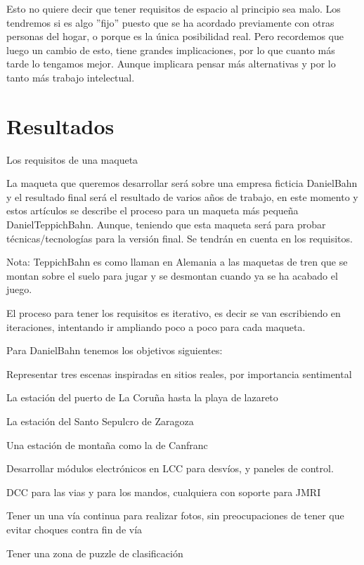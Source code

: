  

Esto no quiere decir que tener requisitos de espacio al principio sea malo. Los tendremos si es algo ”fijo” puesto que se ha acordado previamente con otras personas del hogar, o porque es la única posibilidad real. Pero recordemos que luego un cambio de esto, tiene grandes implicaciones, por lo que cuanto más tarde  lo tengamos mejor. Aunque implicara pensar más alternativas y por lo tanto más trabajo intelectual. 

 
\section{Resultados}
Los requisitos de una maqueta 

La maqueta que queremos desarrollar será sobre una empresa ficticia DanielBahn y el resultado final será el resultado de varios años de trabajo, en este momento y estos artículos se describe el proceso para un maqueta más pequeña DanielTeppichBahn. Aunque, teniendo que esta maqueta será para probar técnicas/tecnologías para la versión final. Se tendrán en cuenta en los requisitos. 

 

Nota: TeppichBahn es como llaman en Alemania a las maquetas de tren que se montan sobre el suelo para jugar y se desmontan cuando ya se ha acabado el juego. 

 

El proceso para tener los requisitos es iterativo, es decir se van escribiendo en iteraciones, intentando ir ampliando poco a poco para cada maqueta. 

Para DanielBahn tenemos los objetivos  siguientes: 

Representar tres escenas inspiradas en sitios reales, por importancia sentimental 

La estación del puerto de La Coruña hasta la playa de lazareto 

La estación del Santo Sepulcro de Zaragoza 

Una estación de montaña como la de Canfranc 

Desarrollar módulos electrónicos en LCC para desvíos, y paneles de control. 

DCC para las vias y para los mandos, cualquiera con soporte para JMRI 

Tener un una vía continua para realizar fotos, sin preocupaciones de tener que evitar choques contra fin de vía 

Tener una zona de puzzle de clasificación 

